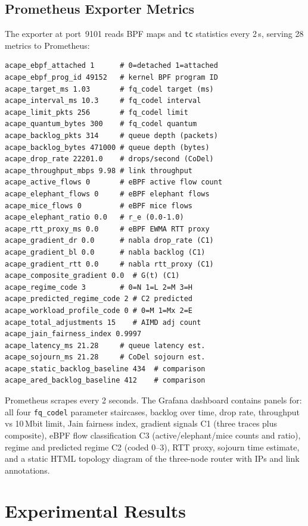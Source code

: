 \documentclass[conference]{IEEEtran}
\begin{document}
\subsection{Prometheus Exporter Metrics}

The exporter at port~9101 reads BPF maps and \texttt{tc} statistics every
2\,s, serving 28 metrics to Prometheus:

\begin{lstlisting}[caption=Full metric list from /metrics endpoint]
acape_ebpf_attached 1      # 0=detached 1=attached
acape_ebpf_prog_id 49152   # kernel BPF program ID
acape_target_ms 1.03       # fq_codel target (ms)
acape_interval_ms 10.3     # fq_codel interval
acape_limit_pkts 256       # fq_codel limit
acape_quantum_bytes 300    # fq_codel quantum
acape_backlog_pkts 314     # queue depth (packets)
acape_backlog_bytes 471000 # queue depth (bytes)
acape_drop_rate 22201.0    # drops/second (CoDel)
acape_throughput_mbps 9.98 # link throughput
acape_active_flows 0       # eBPF active flow count
acape_elephant_flows 0     # eBPF elephant flows
acape_mice_flows 0         # eBPF mice flows
acape_elephant_ratio 0.0   # r_e (0.0-1.0)
acape_rtt_proxy_ms 0.0     # eBPF EWMA RTT proxy
acape_gradient_dr 0.0      # nabla drop_rate (C1)
acape_gradient_bl 0.0      # nabla backlog (C1)
acape_gradient_rtt 0.0     # nabla rtt_proxy (C1)
acape_composite_gradient 0.0  # G(t) (C1)
acape_regime_code 3        # 0=N 1=L 2=M 3=H
acape_predicted_regime_code 2 # C2 predicted
acape_workload_profile_code 0 # 0=M 1=Mx 2=E
acape_total_adjustments 15    # AIMD adj count
acape_jain_fairness_index 0.9997
acape_latency_ms 21.28     # queue latency est.
acape_sojourn_ms 21.28     # CoDel sojourn est.
acape_static_backlog_baseline 434  # comparison
acape_ared_backlog_baseline 412    # comparison
\end{lstlisting}

Prometheus scrapes every 2 seconds. The Grafana dashboard contains panels
for: all four \texttt{fq\_codel} parameter staircases, backlog over time, drop
rate, throughput vs 10\,Mbit limit, Jain fairness index, gradient signals C1
(three traces plus composite), eBPF flow classification C3 (active/elephant/mice
counts and ratio), regime and predicted regime C2 (coded 0--3), RTT proxy,
sojourn time estimate, and a static HTML topology diagram of the three-node
router with IPs and link annotations.

\section{Experimental Results}
\end{document}
